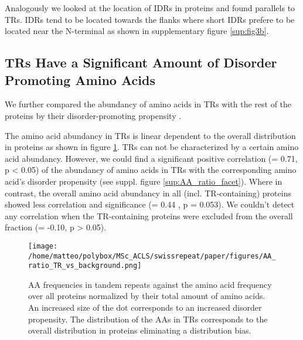 \documentclass[a4,center,fleqn]{NAR}
\begin{document}
Analogously we looked at the location of IDRs in proteins and found parallels to TRs. IDRs tend to be located towards the flanks where short IDRs prefere to be located near the N-terminal as shown in supplementary figure \ref{sup:fig3b}. 

\subsection{TRs Have a Significant Amount of Disorder Promoting Amino Acids}
We further compared the abundancy of amino acids in TRs with the rest of the proteins by their disorder-promoting propensity \cite{Uversky2013}.

The amino acid abundancy in TRs is linear dependent to the overall distribution in proteins as shown in figure \ref{AA_ratio}. TRs can not be characterized by a certain amino acid abundancy. However, we could find a significant positive correlation (\rho = 0.71, p < 0.05) of the abundancy of amino acids in TRs with the corresponding amino acid's disorder propensity (see suppl. figure \ref{sup:AA_ratio_facet}). Where in contrast, the overall amino acid abundancy in all (incl. TR-containing) proteins showed less correlation and significance (\rho = 0.44 , p = 0.053). We couldn't detect any correlation when the TR-containing proteins were excluded from the overall fraction (\rho = -0.10, p > 0.05).

\begin{figure}[t]
\begin{center}
\texttt{[image: /home/matteo/polybox/MSc\_ACLS/swissrepeat/paper/figures/AA\_ratio\_TR\_vs\_background.png]}
\end{center}
\caption{AA frequencies in tandem repeats against the amino acid frequency over all proteins normalized by their total amount of amino acids. An increased size of the dot corresponds to an increased disorder propensity. The distribution of the AAs in TRs corresponds to the overall distribution in proteins eliminating a distribution bias.}
\label{AA_ratio}
\end{figure}
\end{document}
